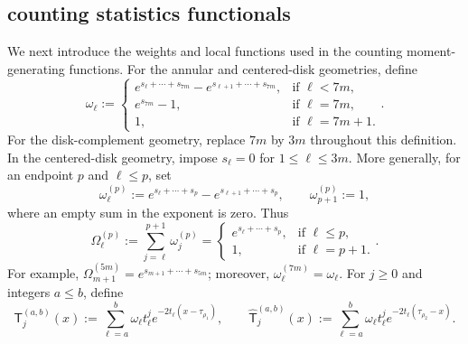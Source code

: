 \documentclass[a4paper]{article}
\numberwithin{equation}{section}
\begin{document}
\subsection{counting statistics functionals}
\label{subsection:counting statistics functionals}
We next introduce the weights and local functions used in the counting
moment-generating functions.  For the annular and centered-disk geometries,
define
\begin{equation}
\label{def of omega ell}
 \omega_{\ell}   
 :=
 \begin{cases}
     e^{s_{\ell}+\cdots+s_{7m}}-e^{s_{\ell+1}+\cdots+s_{7m}}, & \text{if } \ell<7m, \\
     e^{s_{7m}}-1, & \text{if } \ell=7m, \\
     1, & \text{if } \ell=7m+1.
 \end{cases}.
\end{equation}
For the disk-complement geometry, replace $7m$ by $3m$ throughout this
definition.  In the centered-disk geometry, impose
$s_{\ell}=0$ for $1\leq \ell\leq 3m$.  More generally, for an endpoint $p$
and $\ell\leq p$, set
\begin{equation}
\omega_{\ell}^{(p)}:=e^{s_{\ell}+\cdots+s_{p}}-e^{s_{\ell+1}+\cdots+s_{p}},
\qquad \omega_{p+1}^{(p)}:=1,
\end{equation}
where an empty sum in the exponent is zero.  Thus
\begin{equation}
\Omega_{\ell}^{(p)}:=\sum_{j=\ell}^{p+1}\omega_j^{(p)}
=\begin{cases}
e^{s_{\ell}+\cdots+s_{p}}, & \text{if } \ell\leq p, \\
1, & \text{if } \ell=p+1.
\end{cases}.
\end{equation}
For example, $\Omega_{m+1}^{(5m)}=e^{s_{m+1}+\cdots+s_{5m}}$; moreover,
$\omega_\ell^{(7m)}=\omega_\ell$.  For $j\geq0$ and integers $a\leq b$,
define
\begin{equation}
\mathsf{T}_{j}^{(a,b)}(x)
:=
\sum_{\ell=a}^{b}\omega_{\ell}t_{\ell}^j e^{-2t_{\ell}(x-\tau_{\rho_1})},
\qquad
\widehat{\mathsf{T}}_j^{(a,b)}(x):=\sum_{\ell=a}^{b}\omega_{\ell}t_{\ell}^j
e^{-2t_{\ell}(\tau_{\rho_2}-x)}.
\end{equation}
\end{document}
